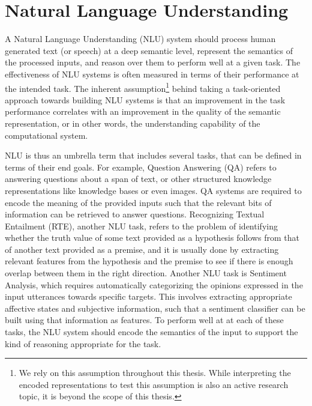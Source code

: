 \section{Natural Language Understanding}
A Natural Language Understanding (NLU) system should process human generated text (or speech) at a deep semantic level, represent the semantics
of the processed inputs, and reason over them to perform well at a given task. The effectiveness of NLU systems is often measured in terms of their
performance at the intended task. The inherent assumption\footnote{We rely on this assumption throughout this thesis. While interpreting the encoded
representations to test this assumption is also an active research topic, it is beyond the scope of this thesis.} behind taking a task-oriented approach
towards building NLU systems is that an improvement in the task performance correlates with an improvement in the quality of the semantic representation,
or in other words, the understanding capability of the computational system.

NLU is thus an umbrella term that includes several tasks, that can be defined in terms of their end goals. For example, Question Answering (QA) refers to answering questions about a span of text,
or other structured knowledge representations like knowledge bases or even images.
QA systems are required to encode the meaning of the provided inputs such that the relevant bits of information can be retrieved to answer questions.
Recognizing Textual Entailment (RTE), another NLU task, refers to the problem of identifying whether the truth value of some text provided as a hypothesis follows from that of another 
text provided as a premise, and it is usually done by extracting relevant features from the hypothesis and the premise to see if there is enough
overlap between them in the right direction. Another NLU task is Sentiment Analysis, which requires automatically categorizing the opinions expressed in the input
utterances towards specific targets. This involves extracting appropriate affective states and subjective information, such that a sentiment classifier
can be built using that information as features. To perform well at at each of these tasks, the NLU system should encode the semantics of the input to support the
kind of reasoning appropriate for the task.

